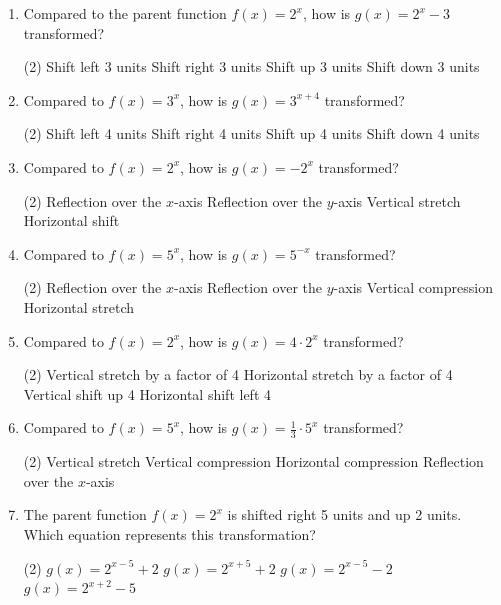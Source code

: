 \documentclass[11pt]{article}
\begin{document}
\begin{enumerate}[leftmargin=1.5em, itemsep=10pt]

\item Compared to the parent function $f(x) = 2^x$, how is $g(x) = 2^x - 3$ transformed?
\begin{tasks}(2)
  \task Shift left 3 units
  \task Shift right 3 units
  \task Shift up 3 units
  \task Shift down 3 units
\end{tasks}

\item Compared to $f(x) = 3^x$, how is $g(x) = 3^{x+4}$ transformed?
\begin{tasks}(2)
  \task Shift left 4 units
  \task Shift right 4 units
  \task Shift up 4 units
  \task Shift down 4 units
\end{tasks}

\item Compared to $f(x) = 2^x$, how is $g(x) = -2^x$ transformed?
\begin{tasks}(2)
  \task Reflection over the $x$-axis
  \task Reflection over the $y$-axis
  \task Vertical stretch
  \task Horizontal shift
\end{tasks}

\item Compared to $f(x) = 5^x$, how is $g(x) = 5^{-x}$ transformed?
\begin{tasks}(2)
  \task Reflection over the $x$-axis
  \task Reflection over the $y$-axis
  \task Vertical compression
  \task Horizontal stretch
\end{tasks}

\item Compared to $f(x) = 2^x$, how is $g(x) = 4 \cdot 2^x$ transformed?
\begin{tasks}(2)
  \task Vertical stretch by a factor of 4
  \task Horizontal stretch by a factor of 4
  \task Vertical shift up 4
  \task Horizontal shift left 4
\end{tasks}

\item Compared to $f(x) = 5^x$, how is $g(x) = \tfrac{1}{3} \cdot 5^x$ transformed?
\begin{tasks}(2)
  \task Vertical stretch
  \task Vertical compression
  \task Horizontal compression
  \task Reflection over the $x$-axis
\end{tasks}

\item The parent function $f(x) = 2^x$ is shifted right 5 units and up 2 units. Which equation represents this transformation?
\begin{tasks}(2)
  \task $g(x) = 2^{x-5} + 2$
  \task $g(x) = 2^{x+5} + 2$
  \task $g(x) = 2^{x-5} - 2$
  \task $g(x) = 2^{x+2} - 5$
\end{tasks}


\end{enumerate}
\end{document}
